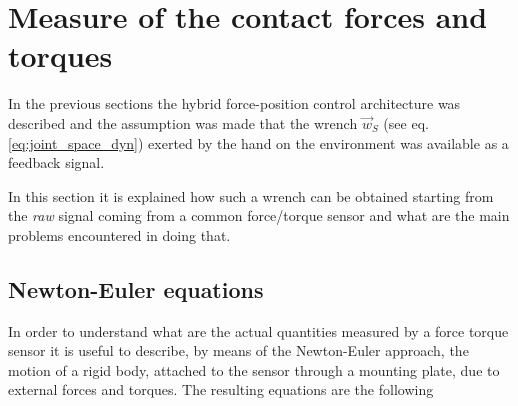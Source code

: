 \section{Measure of the contact forces and torques}
In the previous sections the hybrid force-position control architecture was described
and the assumption was made that the wrench $\vec{w}_{S}$ (see eq. \ref{eq:joint_space_dyn})
exerted by the hand on the environment was available as a feedback signal.
\par
In this section it is explained how such a wrench can be obtained starting from the \emph{raw} signal
coming from a common force/torque sensor and what are the main problems encountered in doing that.

\subsection{Newton-Euler equations}
In order to understand what are the actual quantities measured by a force torque sensor it is useful
to describe, by means of the Newton-Euler approach, the motion of a rigid body, attached to the
sensor through a mounting plate, due to external forces and torques. The resulting equations are the following


